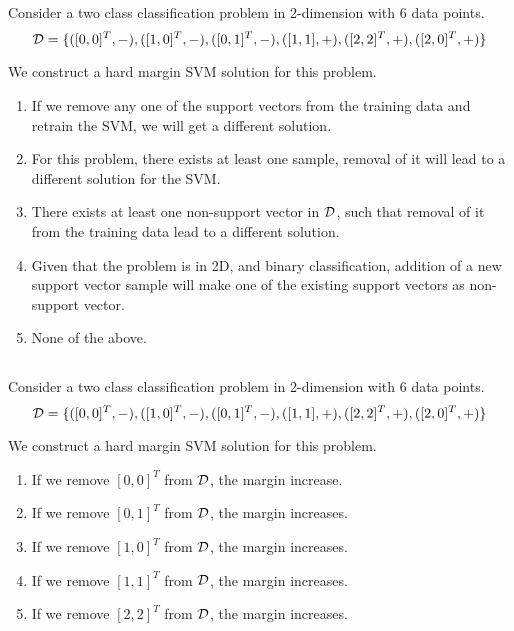 \begin{frame}
\section{}
Consider a two class classification problem in 2-dimension with 6 data points.
\[ {\cal D} = \{([0,0]^T,-), ([1,0]^T,-), ([0,1]^T,-), ([1,1],+), ([2,2]^T,+), ([2,0]^T,+)  \}\]

We construct a hard margin SVM solution for this problem.

\begin{enumerate}[label=(\Alph*)]
\item If we remove any one of the support vectors from the training data and retrain the SVM, we will get a different solution.
\item For this problem, there exists at least one sample, removal of it will lead to a different solution for the SVM.    %
\item There exists at least one non-support vector in ${\cal D}$, such that removal of it from the training data lead to a different solution.
\item Given that the problem is in 2D, and binary classification, addition of a new support vector sample will make one of the existing support vectors as non-support vector.
\item None of the above.    %
\end{enumerate}
\end{frame}


\begin{frame}
\section{}
Consider a two class classification problem in 2-dimension with 6 data points.
\[ {\cal D} = \{([0,0]^T,-), ([1,0]^T,-), ([0,1]^T,-), ([1,1],+), ([2,2]^T,+), ([2,0]^T,+)  \}\]

We construct a hard margin SVM solution for this problem.

\begin{enumerate}[label=(\Alph*)]
\item If we remove $[0,0]^T$ from ${\cal D}$, the margin increase.
\item If we remove $[0,1]^T$ from ${\cal D}$, the margin increases.
\item If we remove $[1,0]^T$ from ${\cal D}$, the margin increases.   %
\item If we remove $[1,1]^T$ from ${\cal D}$, the margin increases.   %
\item If we remove $[2,2]^T$ from ${\cal D}$, the margin increases.
\end{enumerate}
\end{frame}


